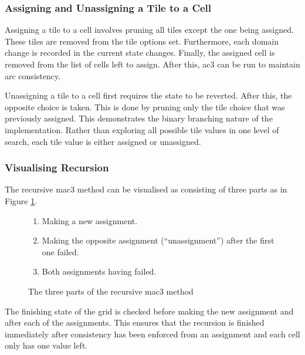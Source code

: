 \subsubsection{Assigning and Unassigning a Tile to a Cell}
Assigning a tile to a cell involves pruning all tiles except the one being assigned. These tiles are removed from the tile options set. Furthermore, each domain change is recorded in the current state changes. Finally, the assigned cell is removed from the list of cells left to assign. After this, \acrshort{ac3} can be run to maintain arc consistency.


Unassigning a tile to a cell first requires the state to be reverted. After this, the opposite choice is taken. This is done by pruning only the tile choice that was previously assigned. This demonstrates the binary branching nature of the implementation. Rather than exploring all possible tile values in one level of search, each tile value is either assigned or unassigned.

\subsubsection{Visualising Recursion}
The recursive \acrshort{mac3} method can be visualised as consisting of three parts as in Figure \ref{fig:mac3Recursion}.

\begin{figure}[H]
    \begin{framed}
        \begin{enumerate}
            \item Making a new assignment.
            \item Making the opposite assignment (``unassignment'') after the first one failed.
            \item Both assignments having failed.
        \end{enumerate}
    \end{framed}
    \caption{The three parts of the recursive \acrshort{mac3} method}
    \label{fig:mac3Recursion}
\end{figure}

The finishing state of the grid is checked before making the new assignment and after each of the assignments. This ensures that the recursion is finished immediately after consistency has been enforced from an assignment and each cell only has one value left.